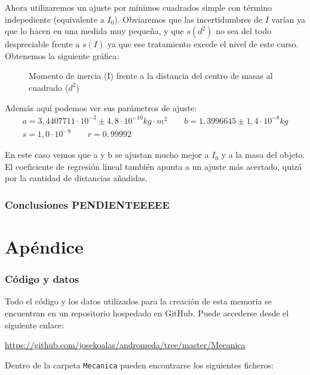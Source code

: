 \documentclass[12pt, a4paper, titlepage]{article}
\newcommand{\code}[1]{\texttt{#1}} %
\begin{document}
  Ahora utilizaremos un ajuste por mínimos cuadrados simple con término indepediente (equivalente a $I_0$). Obviaremos que las incertidumbres de $I$ varían ya que lo hacen en una medida muy pequeña, y que $s(d^2)$ no sea del todo despreciable frente a $s(I)$ ya que ese tratamiento excede el nivel de este curso. Obtenemos la siguiente gráfica:

  \begin{figure}[H]
    \hspace{3.2em} 
    \caption{Momento de inercia (I) frente a la distancia del centro de masas al cuadrado ($d^2$)}
  \end{figure}


  Además aquí podemos ver sus parámetros de ajuste:
  \begin{gather*}
    a = 3,4407711 \cdot 10^{-3} \pm 4,8 \cdot 10^{-10} kg \cdot m^2 \qquad b = 1,3996645 \pm 1,4 \cdot 10^{-8} kg \\
    s = 1,0 \cdot 10^{-9} \qquad r = 0,99992
  \end{gather*}

  En este caso vemos que a y b se ajustan mucho mejor a $I_0$ y a la masa del objeto. El coeficiente de regresión lineal también apunta a un ajuste más acertado, quizá por la cantidad de distancias añadidas.


  \newpage
  \section{Conclusiones PENDIENTEEEEE}




  \newpage
  \part*{Apéndice}

  \section*{Código y datos}

  Todo el código y los datos utilizados para la creación de esta memoria se encuentran en un repositorio hospedado en GitHub. Puede accederse desde el siguiente enlace:

  \url{https://github.com/josekoalas/andromeda/tree/master/Mecanica}

  Dentro de la carpeta \code{Mecanica} pueden encontrarse los siguientes ficheros:
\end{document}
